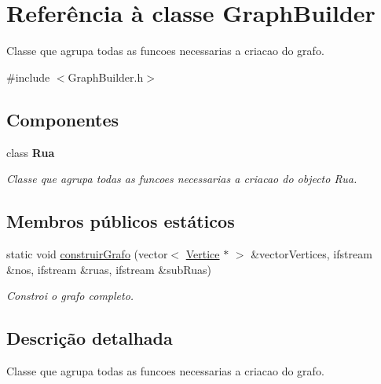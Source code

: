 \hypertarget{class_graph_builder}{\section{Referência à classe Graph\-Builder}
\label{class_graph_builder}
}


Classe que agrupa todas as funcoes necessarias a criacao do grafo.  




{\ttfamily \#include $<$Graph\-Builder.\-h$>$}

\subsection*{Componentes}
\begin{DoxyCompactItemize}
\item 
class {\bfseries Rua}
\begin{DoxyCompactList}\small\item\em Classe que agrupa todas as funcoes necessarias a criacao do objecto Rua. \end{DoxyCompactList}\end{DoxyCompactItemize}
\subsection*{Membros públicos estáticos}
\begin{DoxyCompactItemize}
\item 
static void \hyperlink{class_graph_builder_a5b010dc934c16aedf78177a017ef0209}{construir\-Grafo} (vector$<$ \hyperlink{class_vertice}{Vertice} $\ast$ $>$ \&vector\-Vertices, ifstream \&nos, ifstream \&ruas, ifstream \&sub\-Ruas)
\begin{DoxyCompactList}\small\item\em Constroi o grafo completo. \end{DoxyCompactList}\end{DoxyCompactItemize}


\subsection{Descrição detalhada}
Classe que agrupa todas as funcoes necessarias a criacao do grafo. 

